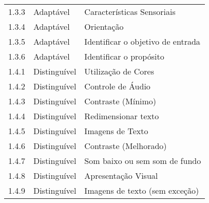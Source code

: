 \begin{table}[]
\begin{tabular}{lll}
 1.3.3           & Adaptável              & Características Sensoriais                                                           \\
 
 1.3.4           & Adaptável              & Orientação                                                                          \\
 
 1.3.5           & Adaptável              & Identificar o objetivo de entrada                                                   \\
 
 1.3.6           & Adaptável              & Identificar o propósito                                                             \\
 
 1.4.1           & Distinguível           & Utilização de Cores                                                                  \\
 
 1.4.2           & Distinguível           & Controle de Áudio                                                                    \\
 
 1.4.3           & Distinguível           & Contraste (Mínimo)                                                                  \\
 
 1.4.4           & Distinguível           & Redimensionar texto                                                                 \\
 
 1.4.5           & Distinguível           & Imagens de Texto                                                                    \\
 
 1.4.6           & Distinguível           & Contraste (Melhorado)                                                               \\
 
 1.4.7           & Distinguível           & Som baixo ou sem som de fundo                                                       \\
 
 1.4.8           & Distinguível           & Apresentação Visual                                                                 \\
 
 1.4.9           & Distinguível           & Imagens de texto (sem exceção)                                                      \\
 

\end{tabular}
\end{table}
